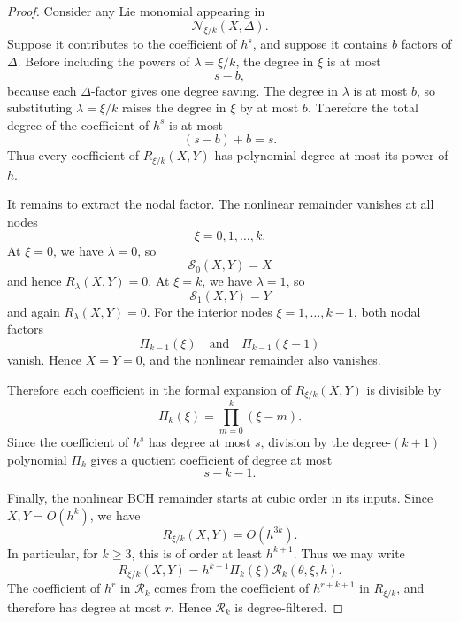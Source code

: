 \documentclass[10pt,a4paper]{amsart}
\begin{document}
\begin{proof}
Consider any Lie monomial appearing in
\[
        \mathcal N_{\xi/k}(X,\Delta).
\]
Suppose it contributes to the coefficient of \(h^s\), and suppose it contains
\(b\) factors of \(\Delta\).  Before including the powers of
\(\lambda=\xi/k\), the degree in \(\xi\) is at most
\[
        s-b,
\]
because each \(\Delta\)-factor gives one degree saving.  The degree in
\(\lambda\) is at most \(b\), so substituting \(\lambda=\xi/k\) raises the
degree in \(\xi\) by at most \(b\).  Therefore the total degree of the
coefficient of \(h^s\) is at most
\[
        (s-b)+b=s.
\]
Thus every coefficient of \(R_{\xi/k}(X,Y)\) has polynomial degree at most its
power of \(h\).

It remains to extract the nodal factor.  The nonlinear remainder vanishes at
all nodes
\[
        \xi=0,1,\ldots,k.
\]
At \(\xi=0\), we have \(\lambda=0\), so
\[
        \mathcal S_0(X,Y)=X
\]
and hence \(R_\lambda(X,Y)=0\).  At \(\xi=k\), we have \(\lambda=1\), so
\[
        \mathcal S_1(X,Y)=Y
\]
and again \(R_\lambda(X,Y)=0\).  For the interior nodes
\(\xi=1,\ldots,k-1\), both nodal factors
\[
        \Pi_{k-1}(\xi)
        \quad\text{and}\quad
        \Pi_{k-1}(\xi-1)
\]
vanish.  Hence \(X=Y=0\), and the nonlinear remainder also vanishes.

Therefore each coefficient in the formal expansion of \(R_{\xi/k}(X,Y)\) is
divisible by
\[
        \Pi_k(\xi)=\prod_{m=0}^{k}(\xi-m).
\]
Since the coefficient of \(h^s\) has degree at most \(s\), division by the
degree-\((k+1)\) polynomial \(\Pi_k\) gives a quotient coefficient of degree
at most
\[
        s-k-1.
\]

Finally, the nonlinear BCH remainder starts at cubic order in its inputs.
Since \(X,Y=O(h^k)\), we have
\[
        R_{\xi/k}(X,Y)=O(h^{3k}).
\]
In particular, for \(k\geq3\), this is of order at least \(h^{k+1}\).  Thus we
may write
\[
        R_{\xi/k}(X,Y)
        =
        h^{k+1}\Pi_k(\xi)\mathcal R_k(\theta,\xi,h).
\]
The coefficient of \(h^r\) in \(\mathcal R_k\) comes from the coefficient of
\(h^{r+k+1}\) in \(R_{\xi/k}\), and therefore has degree at most \(r\).  Hence
\(\mathcal R_k\) is degree-filtered.
\end{proof}
\end{document}
